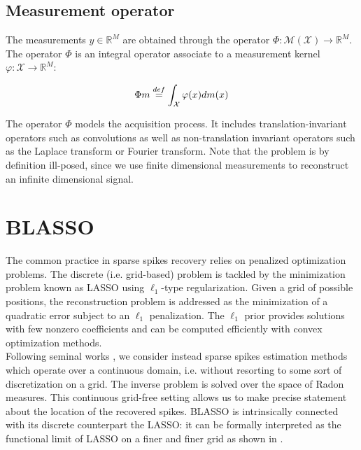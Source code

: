 \documentclass[a4paper,12pt,oneside]{report}
\theoremstyle{named}
\begin{document}
\subsection{Measurement operator}
The measurements $y \in \mathbb{R}^M$ are obtained through the operator $\Phi : \mathcal{M}(\mathcal{X}) \xrightarrow{} \mathbb{R}^M$. The operator $\Phi$ is an integral operator associate to a measurement kernel $\varphi : \mathcal{X} \xrightarrow{} \mathbb{R}^M:$

\begin{equation} \label{measurements}
    \Phi m \stackrel{def}{=} \int_{\mathcal{X}} \varphi(x) dm(x)  \\
\end{equation}

The operator $\Phi$ models the acquisition process. It includes translation-invariant operators such as convolutions as well as non-translation invariant operators such as the Laplace transform or Fourier transform. Note that the problem is by definition ill-posed, since we use finite dimensional measurements to reconstruct an infinite dimensional signal.

\section{BLASSO}

The common practice in sparse spikes recovery relies on penalized optimization problems. The discrete (i.e. grid-based) problem is tackled by the minimization problem known as LASSO \cite{Tibshirani1996} using $\ell_1$-type regularization. Given a grid of possible positions, the reconstruction problem is addressed as the minimization of a quadratic error subject to an $\ell_1$ penalization. The $\ell_1$ prior provides solutions with few nonzero coefficients and can be computed efficiently with convex optimization methods. \\

Following seminal works \cite{Bredies2012, Candes2012, Castro2015, Duval2014}, we consider instead sparse spikes estimation methods which operate over a continuous domain, i.e. without resorting to some sort of discretization on a grid. The inverse problem is solved over the space of Radon measures. This continuous grid-free setting allows us to make precise statement about the location of the recovered spikes. BLASSO is intrinsically connected with its discrete counterpart the LASSO: it can be formally interpreted as the functional limit of LASSO on a finer and finer grid as shown in \cite{Duval2014}.
\end{document}
